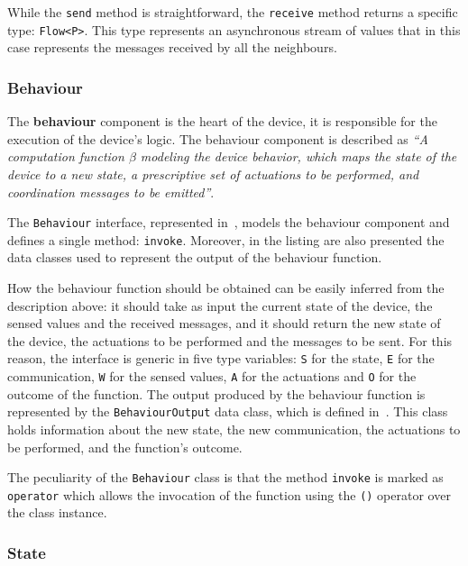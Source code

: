 While the \texttt{send} method is straightforward, the \texttt{receive} method returns a specific type: \texttt{Flow<P>}.
This type represents an asynchronous stream of values that in this case represents the messages received by all the neighbours.

\subsubsection{Behaviour}

The \textbf{behaviour} component is the heart of the device, it is responsible for the execution of the device's logic.
The behaviour component is described as \textit{``A computation function $\beta$
	modeling the device behavior, which maps the state of the device to a new state, a prescriptive set of actuations to be performed,
	and coordination messages to be emitted''}.

The \texttt{Behaviour} interface, represented in~, models the behaviour component and defines a single method:
\texttt{invoke}. Moreover, in the listing are also presented the data classes used to represent the output of the behaviour function.

How the behaviour function should be obtained can be easily inferred from the description above: it should take as input the current state of
the device, the sensed values and the received messages, and it should return the new state of the device, the actuations to be performed and the
messages to be sent. For this reason, the interface is generic in five type variables: \texttt{S} for the state, \texttt{E} for the communication,
\texttt{W} for the sensed values, \texttt{A} for the actuations and \texttt{O} for the outcome of the function.
The output produced by the behaviour function is represented by the \texttt{BehaviourOutput} data class, which is defined
in~. This class holds information about the new state, the new communication, the actuations to be performed, and the
function's outcome.



The peculiarity of the \texttt{Behaviour} class is that the method \texttt{invoke} is marked as \texttt{operator} which allows the invocation of the
function using the \texttt{()} operator over the class instance.

\subsubsection{State}

